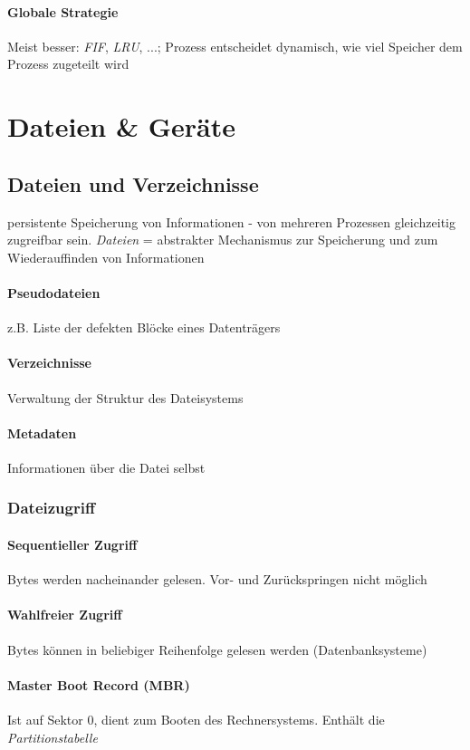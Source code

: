 \documentclass[11pt,a4paper,landscape]{article}
\begin{document}
\begin{multicols*}{3}
	\paragraph{Globale Strategie} Meist besser: \textit{FIF}, \textit{LRU}, ...; Prozess entscheidet dynamisch, wie viel Speicher dem Prozess zugeteilt wird
	\section{Dateien \& Geräte}
	\subsection{Dateien und Verzeichnisse}
	persistente Speicherung von Informationen - von mehreren Prozessen gleichzeitig zugreifbar sein. \textit{Dateien} = abstrakter Mechanismus zur Speicherung und zum Wiederauffinden von Informationen
	\paragraph{Pseudodateien} z.B. Liste der defekten Blöcke eines Datenträgers
	\paragraph{Verzeichnisse} Verwaltung der Struktur des Dateisystems
	\paragraph{Metadaten} Informationen über die Datei selbst
	\subsubsection{Dateizugriff}
	\paragraph{Sequentieller Zugriff} Bytes werden nacheinander gelesen. Vor- und Zurückspringen nicht möglich
	\paragraph{Wahlfreier Zugriff} Bytes können in beliebiger Reihenfolge gelesen werden (Datenbanksysteme)
	\paragraph{Master Boot Record (MBR)} Ist auf Sektor 0, dient zum Booten des Rechnersystems. Enthält die \textit{Partitionstabelle}

\end{multicols*}
\end{document}
